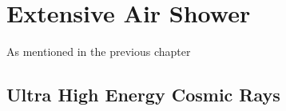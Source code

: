 
\chapter{Extensive Air Shower}
\label{sec:EAS}

As mentioned in the previous chapter 

\section{Ultra High Energy Cosmic Rays}
\label{sec:UHECR}